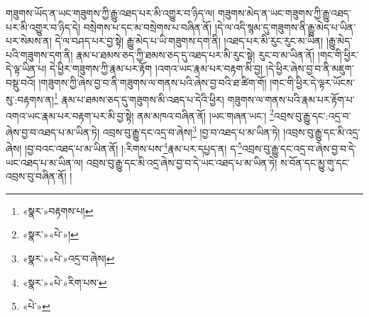 གཟུགས་ཡོད་ན་ཡང་གཟུགས་ཀྱི་རྒྱུ་འཐད་པར་མི་འགྱུར་བ་ཉིད་ལ། གཟུགས་མེད་ན་ཡང་གཟུགས་ཀྱི་རྒྱུ་འཐད་པར་མི་འགྱུར་བ་ཉིད་དེ། བསྲེགས་པ་དང་མ་བསྲེགས་པ་བཞིན་ནོ། །དེ་ལ་འདི་སྙམ་དུ་གཟུགས་ནི་རྒྱུ་མེད་པ་ཡིན་པར་སེམས་ན། དེ་ལ་བཤད་པར་བྱ་སྟེ། རྒྱུ་མེད་པ་ཡི་གཟུགས་དག་ནི། །འཐད་པར་མི་རུང་རུང་མ་ཡིན། །རྒྱུ་མེད་པའི་གཟུགས་དག་ནི། རྣམ་པ་ཐམས་ཅད་ཀྱི་ཐམས་ཅད་དུ་འཐད་པར་མི་རུང་སྟེ། རུང་བ་མ་ཡིན་ནོ། །གང་གི་ཕྱིར་དེ་ལྟ་ཡིན་པ། དེ་ཕྱིར་གཟུགས་ཀྱི་རྣམ་པར་རྟོག །འགའ་ཡང་རྣམ་པར་བརྟག་མི་བྱ། །དེ་ཕྱིར་ཞེས་བྱ་བ་ནི་མཇུག་བསྡུ་བའོ། །གཟུགས་ཀྱི་ཞེས་བྱ་བ་ནི་གཟུགས་ལ་གནས་པའི་ཞེས་བྱ་བའི་ཐ་ཚིག་གོ། །གང་གི་ཕྱིར་དེ་ལྟར་ཡོངས་སུ་:བརྟགས་ན།\footnote{«སྣར་»བརྟགས་པ།} རྣམ་པ་ཐམས་ཅད་དུ་གཟུགས་མི་འཐད་པ་དེའི་ཕྱིར། གཟུགས་ལ་གནས་པའི་རྣམ་པར་རྟོག་པ་འགའ་ཡང་རྣམ་པར་བརྟག་པར་མི་བྱ་སྟེ། ནམ་མཁའ་བཞིན་ནོ། །ཡང་གཞན་ཡང་། \footnote{«སྣར་»«པེ་»།  }འབྲས་བུ་རྒྱུ་དང་:འདྲ་བ་ཞེས་བྱ་བ་འཐད་པ་མ་ཡིན་ཏེ། འབྲས་བུ་རྒྱུ་དང་འདྲ་བ་ཞེས།\footnote{«སྣར་»«པེ་»འདྲ་བ་ཞེས།} །བྱ་བ་འཐད་པ་མ་ཡིན་ཏེ། །འབྲས་བུ་རྒྱུ་དང་མི་འདྲ་ཞེས། །བྱ་བའང་འཐད་པ་མ་ཡིན་ནོ། །:རིགས་པས་\footnote{«སྣར་»«པེ་»རིག་པས་}རྣམ་པར་དཔྱད་ན། ད་\footnote{«པེ་»}འབྲས་བུ་རྒྱུ་དང་འདྲ་བ་ཞེས་བྱ་བ་དེ་ཡང་འཐད་པ་མ་ཡིན་ལ། འབྲས་བུ་རྒྱུ་དང་མི་འདྲ་ཞེས་བྱ་བ་དེ་ཡང་འཐད་པ་མ་ཡིན་ཏེ། ས་བོན་དང་མྱུ་གུ་དང་འབྲས་བུ་བཞིན་ནོ། །
